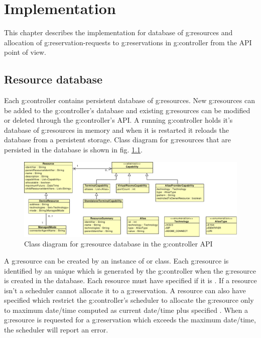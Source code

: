 \chapter{Implementation}



This chapter describes the implementation for database of \glspl{g:resource} and allocation of \glspl{g:reservation-request} to \glspl{g:reservation} in \gls{g:controller} from the API point of view.

\section{Resource database}

Each \gls{g:controller} contains persistent database of \glspl{g:resource}. New \glspl{g:resource} can be added to the \gls{g:controller}'s database and existing \glspl{g:resource} can be modified or deleted through the \gls{g:controller}'s API. A running \gls{g:controller} holds it's database of \glspl{g:resource} in memory and when it is restarted it reloads the database from a persistent storage. Class diagram for \glspl{g:resource} that are persisted in the database is shown in fig. \ref{fig:cd_api_resources}.

\begin{figure}[ht!]
\includegraphics[width=\textwidth]{diagrams/cd_api_resources}
\caption{Class diagram for \gls{g:resource} database in the \gls{g:controller} API}
\label{fig:cd_api_resources}
\end{figure}

A \gls{g:resource} can be created by an instance of  or  class. Each \gls{g:resource} is identified by an unique  which is generated by the \gls{g:controller} when the \gls{g:resource} is created in the database. Each resource must have specified if it is . If a resource isn't  a scheduler cannot allocate it to a \gls{g:reservation}. A resource can also have specified  which restrict the \gls{g:controller}'s scheduler to allocate the \gls{g:resource} only to maximum date/time computed as current date/time plus specified . When a \gls{g:resource} is requested for a \gls{g:reservation} which exceeds the maximum date/time, the scheduler will report an error.


